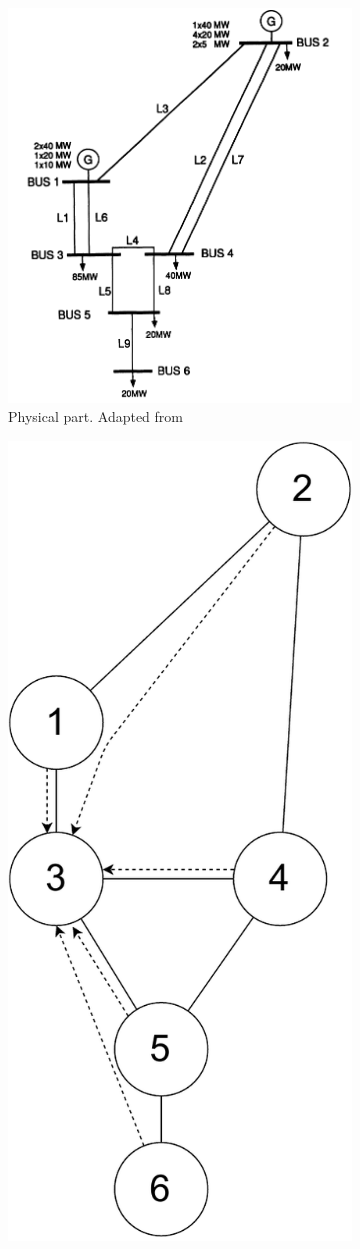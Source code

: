 \begin{figure}
     \centering
     \begin{subfigure}[b]{0.45\textwidth}
         \centering
         \includegraphics[width=\linewidth]{Figs/RBTS.png}
         \caption{Physical part. Adapted from~\cite{rbts}}
         \label{fig:RBTS-phys}
     \end{subfigure}
     \hfill
     \begin{subfigure}[b]{0.45\textwidth}
         \centering
         \includegraphics[width=0.5\linewidth]{Figs/RBTS_com.pdf}

\end{subfigure}
\end{figure}
